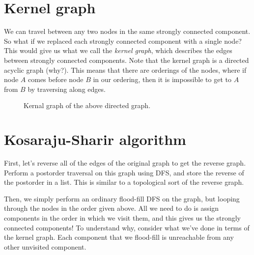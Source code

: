 \documentclass{article}
\begin{document}
\section{Kernel graph}

We can travel between any two nodes in the same strongly connected component. So what if we replaced each strongly connected component with a single node? This would give us what we call the \textit{kernel graph}, which describes the edges between strongly connected components. Note that the kernel graph is a directed acyclic graph (why?). This means that there are orderings of the nodes, where if node $A$ comes before node $B$ in our ordering, then it is impossible to get to $A$ from $B$ by traversing along edges. 

\begin{figure}[h]
\center
{}
\caption{Kernal graph of the above directed graph.}
\end{figure}


\section{Kosaraju-Sharir algorithm}

First, let's reverse all of the edges of the original graph to get the reverse graph. Perform a postorder traversal on this graph using DFS, and store the reverse of the postorder in a list. This is similar to a topological sort of the reverse graph.

Then, we simply perform an ordinary flood-fill DFS on the graph, but looping through the nodes in the order given above. All we need to do is assign components in the order in which we visit them, and this gives us the strongly connected components! To understand why, consider what we've done in terms of the kernel graph. Each component that we flood-fill is unreachable from any other unvisited component.
\end{document}
